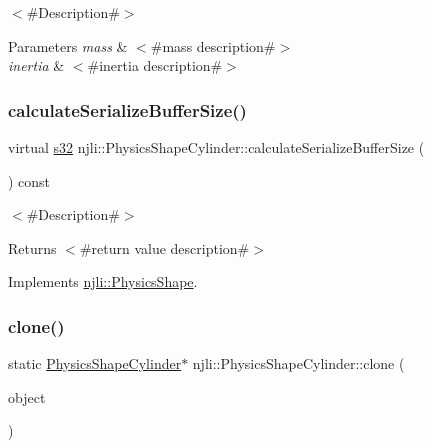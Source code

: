 $<$\#\+Description\#$>$


\begin{DoxyParams}{Parameters}
{\em mass} & $<$\#mass description\#$>$ \\
\hline
{\em inertia} & $<$\#inertia description\#$>$ \\
\hline
\end{DoxyParams}
\mbox{\label{classnjli_1_1_physics_shape_cylinder_a594a3ced7daabd53c425d79f6bfb4173}} 
\subsubsection{\texorpdfstring{calculate\+Serialize\+Buffer\+Size()}{calculateSerializeBufferSize()}}
{\footnotesize\ttfamily virtual \mbox{\hyperlink{_util_8h_aa62c75d314a0d1f37f79c4b73b2292e2}{s32}} njli\+::\+Physics\+Shape\+Cylinder\+::calculate\+Serialize\+Buffer\+Size (\begin{DoxyParamCaption}{ }\end{DoxyParamCaption}) const\hspace{0.3cm}{\ttfamily [virtual]}}

$<$\#\+Description\#$>$

\begin{DoxyReturn}{Returns}
$<$\#return value description\#$>$ 
\end{DoxyReturn}


Implements \mbox{\hyperlink{classnjli_1_1_physics_shape_a0612a1c8c3f4520d78cb7f5838f03074}{njli\+::\+Physics\+Shape}}.

\mbox{\label{classnjli_1_1_physics_shape_cylinder_a00d9bbd12c316e95087402a703fbfe17}} 
\subsubsection{\texorpdfstring{clone()}{clone()}}
{\footnotesize\ttfamily static \mbox{\hyperlink{classnjli_1_1_physics_shape_cylinder}{Physics\+Shape\+Cylinder}}$\ast$ njli\+::\+Physics\+Shape\+Cylinder\+::clone (\begin{DoxyParamCaption}\item[{const \mbox{\hyperlink{classnjli_1_1_physics_shape_cylinder}{Physics\+Shape\+Cylinder}} \&}]{object }\end{DoxyParamCaption})\hspace{0.3cm}{\ttfamily [static]}}

